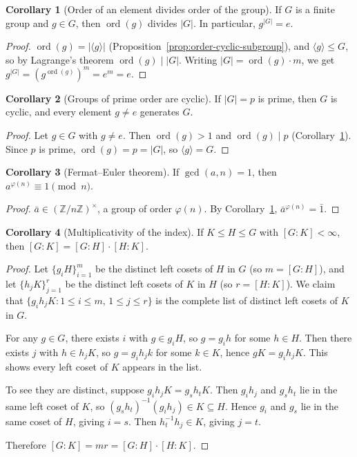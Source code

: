 \documentclass[12pt,a4paper,openany]{book}
\theoremstyle{definition}
\newtheorem{corollary}{Corollary}[chapter]
\theoremstyle{remark}
\newcommand{\Z}{\mathbb{Z}}
\DeclareMathOperator{\ord}{ord}
\renewcommand{\gcd}{\operatorname{gcd}}
\begin{document}
\begin{corollary}[Order of an element divides order of the group]
\label{cor:order-divides}
If $G$ is a finite group and $g\in G$, then $\ord(g)$ divides $|G|$.  In
particular, $g^{|G|}=e$.
\end{corollary}

\begin{proof}
$\ord(g)=|\langle g\rangle|$ (Proposition~\ref{prop:order-cyclic-subgroup}),
and $\langle g\rangle\le G$, so by Lagrange's theorem $\ord(g)\mid|G|$.
Writing $|G|=\ord(g)\cdot m$, we get $g^{|G|}=(g^{\ord(g)})^m=e^m=e$.
\end{proof}

\begin{corollary}[Groups of prime order are cyclic]
\label{cor:prime-order-cyclic}
If $|G|=p$ is prime, then $G$ is cyclic, and every element $g\neq e$
generates $G$.
\end{corollary}

\begin{proof}
Let $g\in G$ with $g\neq e$.  Then $\ord(g)>1$ and $\ord(g)\mid p$
(Corollary~\ref{cor:order-divides}).  Since $p$ is prime, $\ord(g)=p=|G|$,
so $\langle g\rangle = G$.
\end{proof}

\begin{corollary}[Fermat--Euler theorem]
\label{cor:fermat-euler}
If $\gcd(a,n)=1$, then $a^{\varphi(n)}\equiv 1\pmod{n}$.
\end{corollary}

\begin{proof}
$\bar a\in(\Z/n\Z)^\times$, a group of order $\varphi(n)$.  By
Corollary~\ref{cor:order-divides}, $\bar a^{\varphi(n)}=\bar 1$.
\end{proof}

\begin{corollary}[Multiplicativity of the index]
\label{cor:index-multiplicativity}
If $K\le H\le G$ with $[G:K]<\infty$, then $[G:K]=[G:H]\cdot[H:K]$.
\end{corollary}

\begin{proof}
Let $\{g_iH\}_{i=1}^m$ be the distinct left cosets of $H$ in $G$ (so
$m=[G:H]$), and let $\{h_jK\}_{j=1}^r$ be the distinct left cosets of $K$
in $H$ (so $r=[H:K]$).  We claim that
$\{g_ih_jK : 1\le i\le m,\, 1\le j\le r\}$
is the complete list of distinct left cosets of $K$ in $G$.

For any $g\in G$, there exists $i$ with $g\in g_iH$, so $g=g_ih$ for some
$h\in H$.  Then there exists $j$ with $h\in h_jK$, so $g=g_ih_jk$ for some
$k\in K$, hence $gK=g_ih_jK$.  This shows every left coset of $K$ appears
in the list.

To see they are distinct, suppose $g_ih_jK=g_sh_tK$.  Then $g_ih_j$ and
$g_sh_t$ lie in the same left coset of $K$, so
$(g_sh_t)^{-1}(g_ih_j)\in K\subseteq H$.  Hence $g_i$ and $g_s$ lie in the
same coset of $H$, giving $i=s$.  Then $h_t^{-1}h_j\in K$, giving $j=t$.

Therefore $[G:K]=mr=[G:H]\cdot[H:K]$.
\end{proof}
\end{document}

